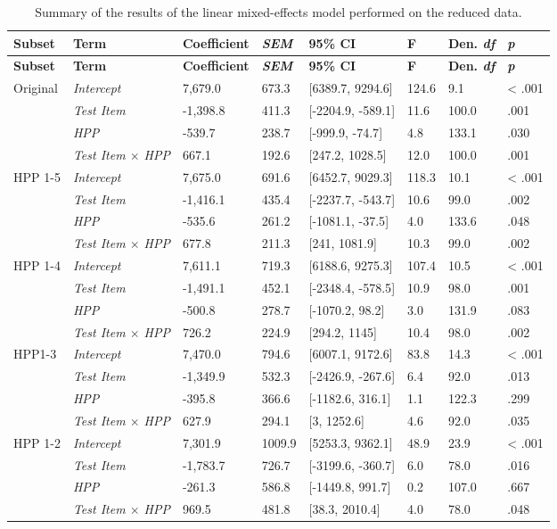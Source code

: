 \documentclass[
  english,
  man,man,floatsintext]{apa6}
\begin{document}
\begin{appendix}
\begin{longtable}[]{@{}llllllll@{}}
\caption{\label{tab:unnamed-chunk-17}Summary of the results of the linear
mixed-effects model performed on the reduced data.}\tabularnewline
\toprule
\textbf{Subset} & \textbf{Term} & \textbf{Coefficient} &
\textbf{\emph{SEM}} & \textbf{95\% CI} & \textbf{F} & \textbf{Den.
\emph{df}} & \textbf{\emph{p}}\tabularnewline
\midrule
\endfirsthead
\toprule
\textbf{Subset} & \textbf{Term} & \textbf{Coefficient} &
\textbf{\emph{SEM}} & \textbf{95\% CI} & \textbf{F} & \textbf{Den.
\emph{df}} & \textbf{\emph{p}}\tabularnewline
\midrule
\endhead
Original & \emph{Intercept} & 7,679.0 & 673.3 & {[}6389.7, 9294.6{]} &
124.6 & 9.1 & \textless{} .001\tabularnewline
& \emph{Test Item} & -1,398.8 & 411.3 & {[}-2204.9, -589.1{]} & 11.6 &
100.0 & .001\tabularnewline
& \emph{HPP} & -539.7 & 238.7 & {[}-999.9, -74.7{]} & 4.8 & 133.1 &
.030\tabularnewline
& \emph{Test Item \(\times\) HPP} & 667.1 & 192.6 & {[}247.2, 1028.5{]}
& 12.0 & 100.0 & .001\tabularnewline
HPP 1-5 & \emph{Intercept} & 7,675.0 & 691.6 & {[}6452.7, 9029.3{]} &
118.3 & 10.1 & \textless{} .001\tabularnewline
& \emph{Test Item} & -1,416.1 & 435.4 & {[}-2237.7, -543.7{]} & 10.6 &
99.0 & .002\tabularnewline
& \emph{HPP} & -535.6 & 261.2 & {[}-1081.1, -37.5{]} & 4.0 & 133.6 &
.048\tabularnewline
& \emph{Test Item \(\times\) HPP} & 677.8 & 211.3 & {[}241, 1081.9{]} &
10.3 & 99.0 & .002\tabularnewline
HPP 1-4 & \emph{Intercept} & 7,611.1 & 719.3 & {[}6188.6, 9275.3{]} &
107.4 & 10.5 & \textless{} .001\tabularnewline
& \emph{Test Item} & -1,491.1 & 452.1 & {[}-2348.4, -578.5{]} & 10.9 &
98.0 & .001\tabularnewline
& \emph{HPP} & -500.8 & 278.7 & {[}-1070.2, 98.2{]} & 3.0 & 131.9 &
.083\tabularnewline
& \emph{Test Item \(\times\) HPP} & 726.2 & 224.9 & {[}294.2, 1145{]} &
10.4 & 98.0 & .002\tabularnewline
HPP1-3 & \emph{Intercept} & 7,470.0 & 794.6 & {[}6007.1, 9172.6{]} &
83.8 & 14.3 & \textless{} .001\tabularnewline
& \emph{Test Item} & -1,349.9 & 532.3 & {[}-2426.9, -267.6{]} & 6.4 &
92.0 & .013\tabularnewline
& \emph{HPP} & -395.8 & 366.6 & {[}-1182.6, 316.1{]} & 1.1 & 122.3 &
.299\tabularnewline
& \emph{Test Item \(\times\) HPP} & 627.9 & 294.1 & {[}3, 1252.6{]} &
4.6 & 92.0 & .035\tabularnewline
HPP 1-2 & \emph{Intercept} & 7,301.9 & 1009.9 & {[}5253.3, 9362.1{]} &
48.9 & 23.9 & \textless{} .001\tabularnewline
& \emph{Test Item} & -1,783.7 & 726.7 & {[}-3199.6, -360.7{]} & 6.0 &
78.0 & .016\tabularnewline
& \emph{HPP} & -261.3 & 586.8 & {[}-1449.8, 991.7{]} & 0.2 & 107.0 &
.667\tabularnewline
& \emph{Test Item \(\times\) HPP} & 969.5 & 481.8 & {[}38.3, 2010.4{]} &
4.0 & 78.0 & .048\tabularnewline
\bottomrule
\end{longtable}


\end{appendix}
\end{document}

